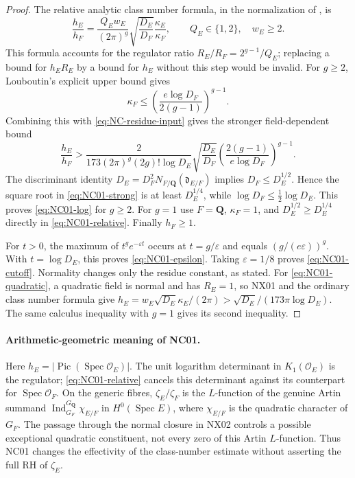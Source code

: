 \begin{proof}
The relative analytic class number formula, in the normalization of
\cite[\S3, equation (21), p.~1200]{NC-Louboutin2001}, is
\begin{equation}\label{eq:NC01-relative}
 \frac{h_E}{h_F}=
 \frac{Q_Ew_E}{(2\pi)^g}
 \sqrt{\frac{D_E}{D_F}}\frac{\kappa_E}{\kappa_F},
 \qquad Q_E\in\{1,2\},\quad w_E\geq2.
\end{equation}
This formula accounts for the regulator ratio
$R_E/R_F=2^{g-1}/Q_E$; replacing a bound for $h_ER_E$ by a bound for
$h_E$ without this step would be invalid.
For $g\geq2$, Louboutin's explicit upper bound
\cite[Theorem~1(1), p.~1195]{NC-Louboutin2001} gives
\[
 \kappa_F\leq
 \left(\frac{e\log D_F}{2(g-1)}\right)^{g-1}.
\]
Combining this with \eqref{eq:NC-residue-input} gives the stronger
field-dependent bound
\begin{equation}\label{eq:NC01-strong}
 \frac{h_E}{h_F}>
 \frac{2}{173(2\pi)^g(2g)!\log D_E}
 \sqrt{\frac{D_E}{D_F}}
 \left(\frac{2(g-1)}{e\log D_F}\right)^{g-1}.
\end{equation}
The discriminant identity
$D_E=D_F^2N_{F/\mathbf Q}(\mathfrak d_{E/F})$ implies
$D_F\leq D_E^{1/2}$.  Hence the square root in
\eqref{eq:NC01-strong} is at least $D_E^{1/4}$, while
$\log D_F\leq\tfrac12\log D_E$.  This proves
\eqref{eq:NC01-log} for $g\geq2$.  For $g=1$ use
$F=\mathbf Q$, $\kappa_F=1$, and
$D_E^{1/2}\geq D_E^{1/4}$ directly in
\eqref{eq:NC01-relative}.  Finally $h_F\geq1$.

For $t>0$, the maximum of $t^g e^{-\varepsilon t}$ occurs at
$t=g/\varepsilon$ and equals $(g/(e\varepsilon))^g$.
With $t=\log D_E$, this proves \eqref{eq:NC01-epsilon}.
Taking $\varepsilon=1/8$ proves \eqref{eq:NC01-cutoff}.
Normality changes only the residue constant, as stated.
For \eqref{eq:NC01-quadratic}, a quadratic field is normal and has
$R_E=1$, so NX01 and the ordinary class number formula give
$h_E=w_E\sqrt{D_E}\kappa_E/(2\pi)>
\sqrt{D_E}/(173\pi\log D_E)$.
The same calculus inequality with $g=1$ gives its second inequality.
\end{proof}

\paragraph{Arithmetic-geometric meaning of NC01.}
Here $h_E=|\operatorname{Pic}(\operatorname{Spec}\mathcal O_E)|$.
The unit logarithm determinant in $K_1(\mathcal O_E)$ is the regulator;
\eqref{eq:NC01-relative} cancels this determinant against its counterpart
for $\operatorname{Spec}\mathcal O_F$.  On the generic fibres,
$\zeta_E/\zeta_F$ is the $L$-function of the genuine Artin summand
$\operatorname{Ind}_{G_F}^{G_{\mathbf Q}}\chi_{E/F}$ in
$H^0(\operatorname{Spec}E)$, where $\chi_{E/F}$ is the quadratic
character of $G_F$.  The passage through the normal closure in NX02
controls a possible exceptional quadratic constituent, not every zero
of this Artin $L$-function.  Thus NC01 changes the effectivity of the
class-number estimate without asserting the full RH of $\zeta_E$.

